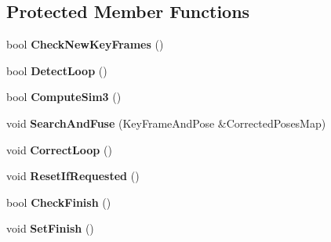 \subsection*{Protected Member Functions}
\begin{DoxyCompactItemize}
\item 
bool {\bfseries Check\+New\+Key\+Frames} ()\hypertarget{classMultiColSLAM_1_1cLoopClosing_a27462546075eee91b3912413d5ef59c6}{}\label{classMultiColSLAM_1_1cLoopClosing_a27462546075eee91b3912413d5ef59c6}

\item 
bool {\bfseries Detect\+Loop} ()\hypertarget{classMultiColSLAM_1_1cLoopClosing_aa017e121385348085329365d5e969549}{}\label{classMultiColSLAM_1_1cLoopClosing_aa017e121385348085329365d5e969549}

\item 
bool {\bfseries Compute\+Sim3} ()\hypertarget{classMultiColSLAM_1_1cLoopClosing_a07fa34266f18f2ffddcac296b6b07019}{}\label{classMultiColSLAM_1_1cLoopClosing_a07fa34266f18f2ffddcac296b6b07019}

\item 
void {\bfseries Search\+And\+Fuse} (Key\+Frame\+And\+Pose \&Corrected\+Poses\+Map)\hypertarget{classMultiColSLAM_1_1cLoopClosing_a4c7659cd3af95902ae1e562d684036f1}{}\label{classMultiColSLAM_1_1cLoopClosing_a4c7659cd3af95902ae1e562d684036f1}

\item 
void {\bfseries Correct\+Loop} ()\hypertarget{classMultiColSLAM_1_1cLoopClosing_a86d0e8a183b656d53ef1858beb646f05}{}\label{classMultiColSLAM_1_1cLoopClosing_a86d0e8a183b656d53ef1858beb646f05}

\item 
void {\bfseries Reset\+If\+Requested} ()\hypertarget{classMultiColSLAM_1_1cLoopClosing_ab235bfb750ee12259599752d6b415e3f}{}\label{classMultiColSLAM_1_1cLoopClosing_ab235bfb750ee12259599752d6b415e3f}

\item 
bool {\bfseries Check\+Finish} ()\hypertarget{classMultiColSLAM_1_1cLoopClosing_a3fe134aaa297ebfe4a1d2383a80426cf}{}\label{classMultiColSLAM_1_1cLoopClosing_a3fe134aaa297ebfe4a1d2383a80426cf}

\item 
void {\bfseries Set\+Finish} ()\hypertarget{classMultiColSLAM_1_1cLoopClosing_a310c0f0fa7313c1aa1255eb5548ba018}{}\label{classMultiColSLAM_1_1cLoopClosing_a310c0f0fa7313c1aa1255eb5548ba018}

\end{DoxyCompactItemize}
